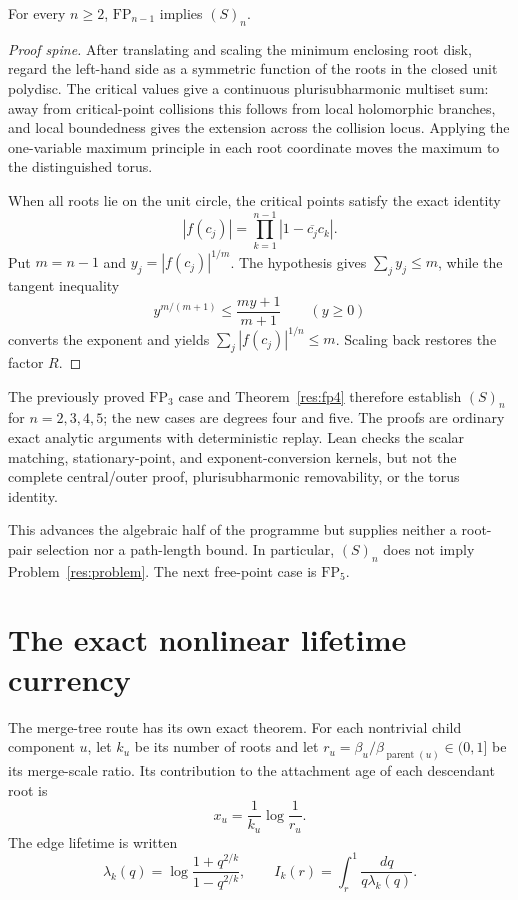 \documentclass[11pt]{article}
\begin{document}
\begin{theorem}\label{res:fp-to-s}
For every $n\ge2$, $\mathrm{FP}_{n-1}$ implies $(S)_n$.
\end{theorem}

\begin{proof}[Proof spine]
After translating and scaling the minimum enclosing root disk, regard the
left-hand side as a symmetric function of the roots in the closed unit
polydisc.  The critical values give a continuous plurisubharmonic multiset
sum: away from critical-point collisions this follows from local holomorphic
branches, and local boundedness gives the extension across the collision
locus.  Applying the one-variable maximum principle in each root coordinate
moves the maximum to the distinguished torus.

When all roots lie on the unit circle, the critical points satisfy the exact
identity
\[
 |f(c_j)|=\prod_{k=1}^{n-1}|1-\overline{c_j}c_k|.
\]
Put $m=n-1$ and $y_j=|f(c_j)|^{1/m}$.  The hypothesis gives
$\sum_jy_j\le m$, while the tangent inequality
\[
 y^{m/(m+1)}\le\frac{my+1}{m+1}\qquad(y\ge0)
\]
converts the exponent and yields $\sum_j|f(c_j)|^{1/n}\le m$.  Scaling back
restores the factor $R$.
\end{proof}

The previously proved $\mathrm{FP}_3$ case and
Theorem~\ref{res:fp4} therefore establish $(S)_n$ for $n=2,3,4,5$; the new
cases are degrees four and five.  The proofs are ordinary exact analytic
arguments with deterministic replay.  Lean checks the scalar matching,
stationary-point, and exponent-conversion kernels, but not the complete
central/outer proof, plurisubharmonic removability, or the torus identity.

This advances the algebraic half of the programme but supplies neither a
root-pair selection nor a path-length bound.  In particular, $(S)_n$ does not
imply Problem~\ref{res:problem}.  The next free-point case is
$\mathrm{FP}_5$.

\section{The exact nonlinear lifetime currency}
\label{sec:orlicz}

The merge-tree route has its own exact theorem.  For each nontrivial child
component $u$, let $k_u$ be its number of roots and let
$r_u=\beta_u/\beta_{\operatorname{parent}(u)}\in(0,1]$ be its merge-scale
ratio.  Its contribution to the attachment age of each descendant root is
\[
 x_u=\frac1{k_u}\log\frac1{r_u}.
\]
The edge lifetime is written
\[
 \lambda_k(q)=\log\frac{1+q^{2/k}}{1-q^{2/k}},
 \qquad
 I_k(r)=\int_r^1\frac{dq}{q\lambda_k(q)}.
\]
\end{document}
